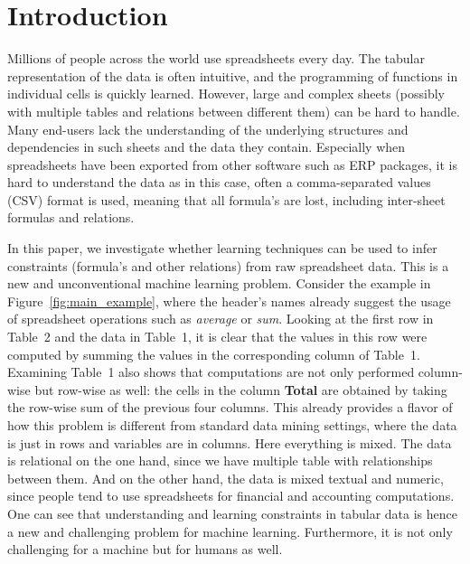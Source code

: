 \documentclass{sig-alternate-05-2015}
\begin{document}
\section{Introduction}
Millions of people across the world use spreadsheets every day. The tabular representation of the data is often intuitive, and the programming of functions in individual cells is quickly learned. However, large and complex sheets (possibly with multiple tables and relations between different them) can be hard to handle. Many end-users lack the understanding of the underlying structures and dependencies in such sheets and the data they contain. Especially when spreadsheets have been exported from
other software such as ERP packages, it is hard to understand the data as in this case,
often a comma-separated values (CSV) format is used, meaning that all formula's are lost, including inter-sheet formulas and relations.

In this paper,  we investigate whether learning techniques can be used to infer constraints (formula's and other relations) from raw spreadsheet data.
This is a new and unconventional machine learning problem.
Consider the example in Figure~\ref{fig:main_example}, where the header's names already suggest the usage of spreadsheet operations such as \textit{average} or \textit{sum}.
Looking at the first row in Table~2 and the data in Table~1, it is clear that the values in this row were computed by summing the values in the corresponding column of Table~1.
Examining Table~1 also shows that computations are not only performed column-wise but row-wise as well: the cells in the column \textbf{Total} are obtained by taking the row-wise sum of the previous four columns.
This already provides a flavor of how this problem is different from standard data mining settings, where the data is just in rows and variables are in columns. Here everything is mixed. The data is relational on the one hand, since we have multiple table with relationships between them. And on the other hand, the data is mixed textual and numeric, since people tend to use spreadsheets for financial and accounting computations. One can see that understanding and learning constraints in tabular data is hence a new and challenging problem for machine learning. Furthermore, it is not only challenging for a machine but for humans as well.
\end{document}
